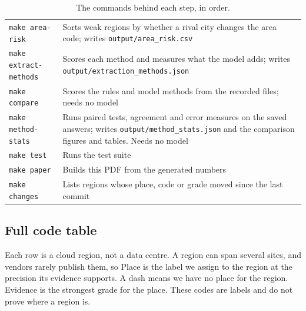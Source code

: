 \documentclass[10pt,twocolumn]{article}
\newcommand{\code}[1]{\texttt{#1}}
\begin{document}
\begin{table}[htbp]
\begin{tabular}{lp{}}
\code{make area-risk} & Sorts weak regions by whether a rival city changes the area code; writes \code{output/area\_risk.csv} \\
\code{make extract-methods} & Scores each method and measures what the model adds; writes \code{output/extraction\_methods.json} \\
\code{make compare} & Scores the rules and model methods from the recorded files; needs no model \\
\code{make method-stats} & Runs paired tests, agreement and error measures on the saved answers; writes \code{output/method\_stats.json} and the comparison figures and tables. Needs no model \\
\code{make test} & Runs the test suite \\
\code{make paper} & Builds this PDF from the generated numbers \\
\code{make changes} & Lists regions whose place, code or grade moved since the last commit \\
\bottomrule
\end{tabular}
\caption{The commands behind each step, in order.}
\label{tab:steps}
\end{table}

\clearpage
\begin{landscape}
\section{Full code table}
\label{app:codes}
Each row is a cloud region, not a data centre. A region can span several sites, and vendors rarely publish them, so Place is the label we assign to the region at the precision its evidence supports. A dash means we have no place for the region. Evidence is the strongest grade for the place. These codes are labels and do not prove where a region is.

\footnotesize

\end{landscape}
\end{document}
